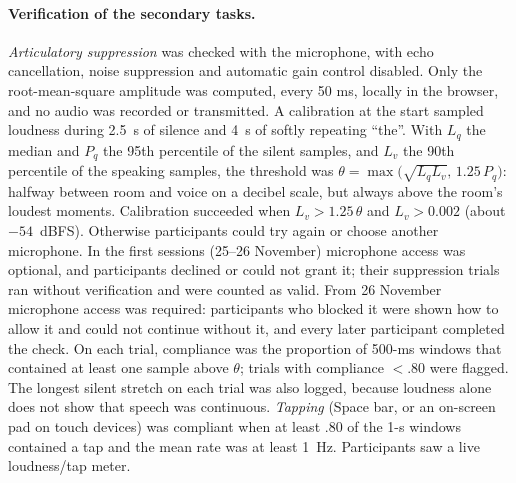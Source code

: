 \documentclass[11pt,a4paper]{article}
\begin{document}
\paragraph{Verification of the secondary tasks.}
\emph{Articulatory suppression} was checked with the microphone, with echo cancellation, noise suppression and automatic
gain control disabled. Only the root-mean-square amplitude was computed, every 50 ms, locally in the browser, and no audio was
recorded or transmitted. A calibration at the start sampled loudness during 2.5~s of silence and 4~s of softly repeating
``the''. With $L_q$ the median and $P_q$ the 95th percentile of the silent samples, and $L_v$ the 90th percentile of the speaking
samples, the threshold was $\theta = \max\!\big(\sqrt{L_q L_v},\, 1.25\,P_q\big)$: halfway between room and voice on a decibel
scale, but always above the room's loudest moments. Calibration succeeded when $L_v > 1.25\,\theta$ and $L_v > 0.002$ (about
$-54$~dBFS). Otherwise participants could try again or choose another microphone. In the first sessions (25--26 November)
microphone access was optional, and \NNoMic{} participants declined or could not grant it; their suppression trials ran without
verification and were counted as valid. From 26 November microphone access was required: participants who blocked it were shown
how to allow it and could not continue without it, and every later participant completed the check. On each trial, compliance was the proportion
of 500-ms windows that contained at least one sample above $\theta$; trials with compliance $< .80$ were flagged. The longest
silent stretch on each trial was also logged, because loudness alone does not show that speech was continuous.
\emph{Tapping} (Space bar, or an on-screen pad on touch devices) was compliant when at least .80 of the 1-s windows contained a
tap and the mean rate was at least 1~Hz. Participants saw a live loudness/tap meter.
\end{document}
